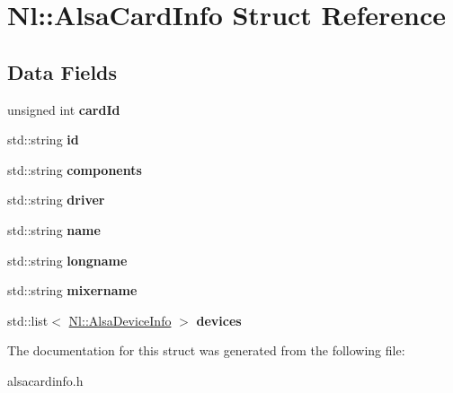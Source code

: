 \hypertarget{structNl_1_1AlsaCardInfo}{\section{Nl\-:\-:Alsa\-Card\-Info Struct Reference}
\label{structNl_1_1AlsaCardInfo}
}
\subsection*{Data Fields}
\begin{DoxyCompactItemize}
\item 
\hypertarget{structNl_1_1AlsaCardInfo_a3b9b9af9d23b182914952a9c3153b771}{unsigned int {\bfseries card\-Id}}\label{structNl_1_1AlsaCardInfo_a3b9b9af9d23b182914952a9c3153b771}

\item 
\hypertarget{structNl_1_1AlsaCardInfo_a82d5257029f683eaaf43253d454615ba}{std\-::string {\bfseries id}}\label{structNl_1_1AlsaCardInfo_a82d5257029f683eaaf43253d454615ba}

\item 
\hypertarget{structNl_1_1AlsaCardInfo_ae5dc289a42f6e674fb79d1cda53b5fe8}{std\-::string {\bfseries components}}\label{structNl_1_1AlsaCardInfo_ae5dc289a42f6e674fb79d1cda53b5fe8}

\item 
\hypertarget{structNl_1_1AlsaCardInfo_aceee43a5f071557613dd23b9a61ed821}{std\-::string {\bfseries driver}}\label{structNl_1_1AlsaCardInfo_aceee43a5f071557613dd23b9a61ed821}

\item 
\hypertarget{structNl_1_1AlsaCardInfo_ae2cf35c6c5e7117afda97dc70604013c}{std\-::string {\bfseries name}}\label{structNl_1_1AlsaCardInfo_ae2cf35c6c5e7117afda97dc70604013c}

\item 
\hypertarget{structNl_1_1AlsaCardInfo_aff1725865f4d2001de555da52b55273d}{std\-::string {\bfseries longname}}\label{structNl_1_1AlsaCardInfo_aff1725865f4d2001de555da52b55273d}

\item 
\hypertarget{structNl_1_1AlsaCardInfo_a001a5de8b858035955fa4ea73ec1edf3}{std\-::string {\bfseries mixername}}\label{structNl_1_1AlsaCardInfo_a001a5de8b858035955fa4ea73ec1edf3}

\item 
\hypertarget{structNl_1_1AlsaCardInfo_ac887d511e19778ab4fe4dfe923ee464e}{std\-::list$<$ \hyperlink{structNl_1_1AlsaDeviceInfo}{Nl\-::\-Alsa\-Device\-Info} $>$ {\bfseries devices}}\label{structNl_1_1AlsaCardInfo_ac887d511e19778ab4fe4dfe923ee464e}

\end{DoxyCompactItemize}


The documentation for this struct was generated from the following file\-:\begin{DoxyCompactItemize}
\item 
alsacardinfo.\-h\end{DoxyCompactItemize}

